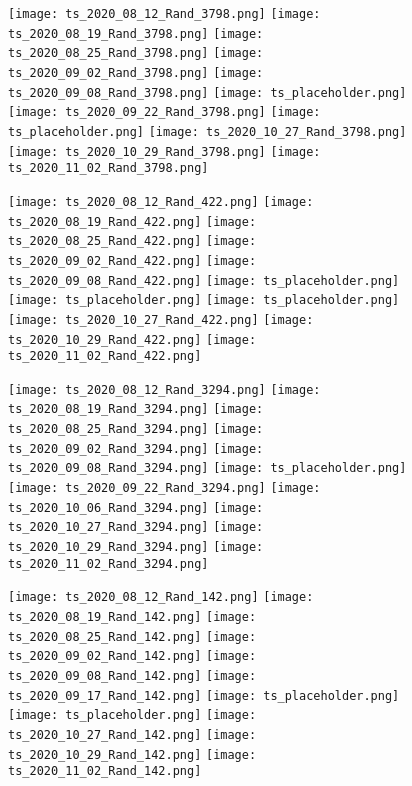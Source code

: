 \documentclass{article}
\begin{document}
\begin{figure}[t]
    \texttt{[image: ts\_2020\_08\_12\_Rand\_3798.png]}
    \texttt{[image: ts\_2020\_08\_19\_Rand\_3798.png]}
    \texttt{[image: ts\_2020\_08\_25\_Rand\_3798.png]}
    \texttt{[image: ts\_2020\_09\_02\_Rand\_3798.png]}
    \texttt{[image: ts\_2020\_09\_08\_Rand\_3798.png]}
    \texttt{[image: ts\_placeholder.png]}
    \texttt{[image: ts\_2020\_09\_22\_Rand\_3798.png]}
    \texttt{[image: ts\_placeholder.png]}
    \texttt{[image: ts\_2020\_10\_27\_Rand\_3798.png]}
    \texttt{[image: ts\_2020\_10\_29\_Rand\_3798.png]}
    \texttt{[image: ts\_2020\_11\_02\_Rand\_3798.png]}

    \texttt{[image: ts\_2020\_08\_12\_Rand\_422.png]}
    \texttt{[image: ts\_2020\_08\_19\_Rand\_422.png]}
    \texttt{[image: ts\_2020\_08\_25\_Rand\_422.png]}
    \texttt{[image: ts\_2020\_09\_02\_Rand\_422.png]}
    \texttt{[image: ts\_2020\_09\_08\_Rand\_422.png]}
    \texttt{[image: ts\_placeholder.png]}
    \texttt{[image: ts\_placeholder.png]}
    \texttt{[image: ts\_placeholder.png]}
    \texttt{[image: ts\_2020\_10\_27\_Rand\_422.png]}
    \texttt{[image: ts\_2020\_10\_29\_Rand\_422.png]}
    \texttt{[image: ts\_2020\_11\_02\_Rand\_422.png]}

    \texttt{[image: ts\_2020\_08\_12\_Rand\_3294.png]}
    \texttt{[image: ts\_2020\_08\_19\_Rand\_3294.png]}
    \texttt{[image: ts\_2020\_08\_25\_Rand\_3294.png]}
    \texttt{[image: ts\_2020\_09\_02\_Rand\_3294.png]}
    \texttt{[image: ts\_2020\_09\_08\_Rand\_3294.png]}
    \texttt{[image: ts\_placeholder.png]}
    \texttt{[image: ts\_2020\_09\_22\_Rand\_3294.png]}
    \texttt{[image: ts\_2020\_10\_06\_Rand\_3294.png]}
    \texttt{[image: ts\_2020\_10\_27\_Rand\_3294.png]}
    \texttt{[image: ts\_2020\_10\_29\_Rand\_3294.png]}
    \texttt{[image: ts\_2020\_11\_02\_Rand\_3294.png]}

    \texttt{[image: ts\_2020\_08\_12\_Rand\_142.png]}
    \texttt{[image: ts\_2020\_08\_19\_Rand\_142.png]}
    \texttt{[image: ts\_2020\_08\_25\_Rand\_142.png]}
    \texttt{[image: ts\_2020\_09\_02\_Rand\_142.png]}
    \texttt{[image: ts\_2020\_09\_08\_Rand\_142.png]}
    \texttt{[image: ts\_2020\_09\_17\_Rand\_142.png]}
    \texttt{[image: ts\_placeholder.png]}
    \texttt{[image: ts\_placeholder.png]}
    \texttt{[image: ts\_2020\_10\_27\_Rand\_142.png]}
    \texttt{[image: ts\_2020\_10\_29\_Rand\_142.png]}
    \texttt{[image: ts\_2020\_11\_02\_Rand\_142.png]}


\end{figure}
\end{document}
